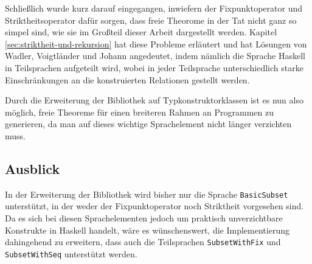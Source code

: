 Schließlich wurde kurz darauf eingegangen, inwiefern der Fixpunktoperator und Striktheitsoperator dafür sorgen,
dass freie Theorome in der Tat nicht ganz so simpel sind, wie sie im Großteil dieser Arbeit dargestellt werden. Kapitel
\ref{sec:striktheit-und-rekursion} hat diese Probleme erläutert und hat Lösungen von Wadler, Voigtländer und Johann angedeutet,
indem nämlich die Sprache Haskell in Teilsprachen aufgeteilt wird, wobei in jeder Teilsprache unterschiedlich starke Einschränkungen
an die konstruierten Relationen gestellt werden.

Durch die Erweiterung der Bibliothek auf Typkonstruktorklassen ist es nun also möglich, freie Theoreme für einen breiteren
Rahmen an Programmen zu generieren, da man auf dieses wichtige Sprachelement nicht länger verzichten muss.

\subsection{Ausblick}

In der Erweiterung der Bibliothek wird bisher nur die Sprache \texttt{BasicSubset} unterstützt, in der weder der Fixpunktoperator
noch Striktheit vorgesehen sind. Da es sich bei diesen Sprachelementen jedoch um praktisch unverzichtbare Konstrukte
in Haskell handelt, wäre es wünschenswert, die Implementierung dahingehend zu erweitern, dass auch
die Teilsprachen \texttt{SubsetWithFix} und \texttt{SubsetWithSeq} unterstützt werden.





